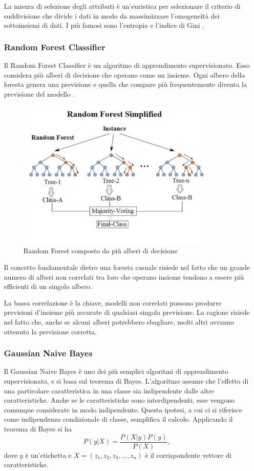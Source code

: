 \documentclass[12pt,italian]{report}
\begin{document}
La misura di selezione degli attributi è un'euristica per selezionare il criterio di suddivisione che divide i dati in modo da massimizzare l'omogeneità dei sottoinsiemi di dati. I più famosi sono l'entropia e l'indice di Gini \cite{DataMiningandKnowledgeDiscoveryHandbook}.

\subsubsection{Random Forest Classifier}
Il Random Forest Classifier è un algoritmo di apprendimento supervisionato. Esso considera più alberi di decisione che operano come un insieme. Ogni albero della foresta genera una previsione e quella che compare più frequentemente diventa la previsione del modello \cite{RandomForest}.

\begin{figure}
	\centering
	\includegraphics[width = 100mm]{immagini/randomForest}
	\caption{Random Forest composto da più alberi di decisione}
\end{figure}

Il concetto fondamentale dietro una foresta casuale risiede nel fatto che un grande numero di alberi non correlati tra loro che operano insieme tendono a essere più efficienti di un singolo albero.

La bassa correlazione è la chiave, modelli non correlati possono produrre previsioni d'insieme più accurate di qualsiasi singola previsione. La ragione risiede nel fatto che, anche se alcuni alberi potrebbero sbagliare, molti altri avranno ottenuto la previsione corretta.
\subsubsection{Gaussian Naive Bayes}
Il Gaussian Naive Bayes è uno dei più semplici algoritmi di apprendimento supervisionato, e si basa sul teorema di Bayes. L'algoritmo assume che l'effetto di una particolare caratteristica in una classe sia indipendente dalle altre caratteristiche. Anche se le caratteristiche sono interdipendenti, esse vengono comunque considerate in modo indipendente\cite{Mitchell97}. Questa ipotesi, a cui ci si riferisce come indipendenza condizionale di classe, semplifica il calcolo.
Applicando il teorema di Bayes si ha
\begin{equation}
P(y | X) = \frac{P(X | y) P(y)}{P(X)},
\end{equation}
dove $y$ è un'etichetta e $X = (z_1, z_2, z_3,...,z_n)$ è il corrispondente vettore di caratteristiche.
\end{document}
